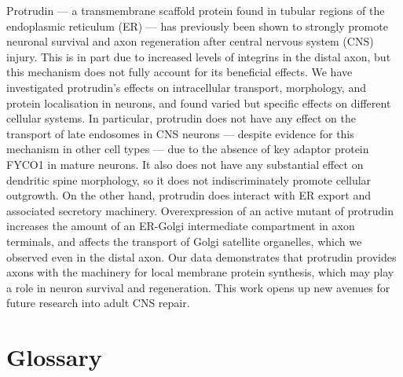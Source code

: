 \documentclass[
  12pt,
  a4paper,
]{book}
\begin{document}
Protrudin --- a transmembrane scaffold protein found in tubular regions of the endoplasmic reticulum (ER) --- has previously been shown to strongly promote neuronal survival and axon regeneration after central nervous system (CNS) injury. This is in part due to increased levels of integrins in the distal axon, but this mechanism does not fully account for its beneficial effects. We have investigated protrudin's effects on intracellular transport, morphology, and protein localisation in neurons, and found varied but specific effects on different cellular systems. In particular, protrudin does not have any effect on the transport of late endosomes in CNS neurons --- despite evidence for this mechanism in other cell types --- due to the absence of key adaptor protein FYCO1 in mature neurons. It also does not have any substantial effect on dendritic spine morphology, so it does not indiscriminately promote cellular outgrowth. On the other hand, protrudin does interact with ER export and associated secretory machinery. Overexpression of an active mutant of protrudin increases the amount of an ER-Golgi intermediate compartment in axon terminals, and affects the transport of Golgi satellite organelles, which we observed even in the distal axon. Our data demonstrates that protrudin provides axons with the machinery for local membrane protein synthesis, which may play a role in neuron survival and regeneration. This work opens up new avenues for future research into adult CNS repair.


\tableofcontents

\hypertarget{GLOSSARY}{%
\chapter*{Glossary}\label{GLOSSARY}}

\end{document}
